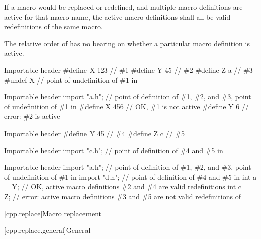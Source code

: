 \pnum
If a macro would be replaced or redefined, and multiple macro definitions
are active for that macro name, the active macro definitions shall all be
valid redefinitions of the same macro.
\begin{note}
The relative order of  has no bearing on whether a
particular macro definition is active.
\end{note}

\pnum
\begin{example}
\begin{codeblocktu}{Importable header }
#define X 123   // \#1
#define Y 45    // \#2
#define Z a     // \#3
#undef X        // point of undefinition of \#1 in 
\end{codeblocktu}

\begin{codeblocktu}{Importable header }
import "a.h";   // point of definition of \#1, \#2, and \#3, point of undefinition of \#1 in 
#define X 456   // OK, \#1 is not active
#define Y 6     // error: \#2 is active
\end{codeblocktu}

\begin{codeblocktu}{Importable header }
#define Y 45    // \#4
#define Z c     // \#5
\end{codeblocktu}

\begin{codeblocktu}{Importable header }
import "c.h";   // point of definition of \#4 and \#5 in 
\end{codeblocktu}

\begin{codeblocktu}{Importable header }
import "a.h";   // point of definition of \#1, \#2, and \#3, point of undefinition of \#1 in 
import "d.h";   // point of definition of \#4 and \#5 in 
int a = Y;      // OK, active macro definitions \#2 and \#4 are valid redefinitions
int c = Z;      // error: active macro definitions \#3 and \#5 are not valid redefinitions of 
\end{codeblocktu}
\end{example}

[cpp.replace]{Macro replacement}%

[cpp.replace.general]{General}%
%
%

